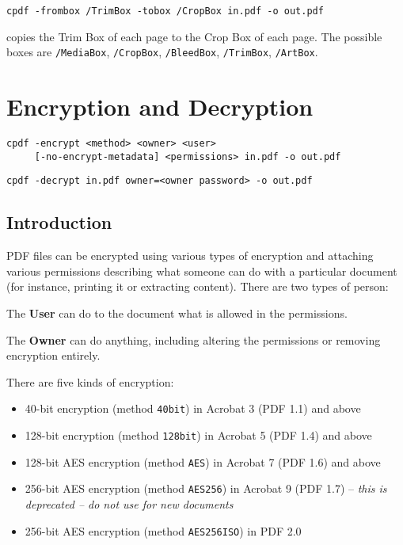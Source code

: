 \documentclass{book}
\begin{document}
  \begin{framed}
    \small\verb!cpdf -frombox /TrimBox -tobox /CropBox in.pdf -o out.pdf!
  \end{framed}
  \noindent copies the Trim Box of each page to the Crop Box of each page. The possible boxes are \texttt{/MediaBox}, \texttt{/CropBox}, \texttt{/BleedBox}, \texttt{/TrimBox}, \texttt{/ArtBox}.

\chapter{Encryption and Decryption}
\label{encryption}
  \begin{framed}
    \small\noindent\verb!cpdf -encrypt <method> <owner> <user>!\\
    \noindent\verb!     [-no-encrypt-metadata] <permissions> in.pdf -o out.pdf!

    \vspace{1.5mm}
    \noindent\verb!cpdf -decrypt in.pdf owner=<owner password> -o out.pdf!
  \end{framed}
  \label{crypt}
  \section{Introduction}
  PDF files can be encrypted using various types of encryption and attaching
various permissions describing what someone can do with a particular document
(for instance, printing it or extracting content). There are two types of
person:
  \begin{description}
    \item The \textbf{User} can do to the document what is allowed in the permissions.
    \item The \textbf{Owner} can do anything, including altering the permissions or removing encryption entirely.
  \end{description}
  There are five kinds of encryption:
  \begin{itemize}
  \item 40-bit encryption (method \texttt{40bit}) in Acrobat 3 (PDF 1.1) and above
  \item 128-bit encryption (method \texttt{128bit}) in Acrobat 5 (PDF 1.4) and above
  \item 128-bit AES encryption (method \texttt{AES}) in Acrobat 7 (PDF 1.6) and above
  \item 256-bit AES encryption (method \texttt{AES256}) in Acrobat 9 (PDF 1.7) -- \textit{this is deprecated -- do not use for new documents}
  \item 256-bit AES encryption (method \texttt{AES256ISO}) in PDF 2.0
  \end{itemize}
\end{document}
